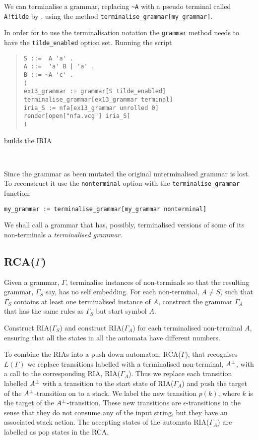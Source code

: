 We can terminalise a grammar, replacing \verb+~A+ with a
pseudo terminal called \verb+A!tilde+ by \gtbs, using the method
\verb+terminalise_grammar[my_grammar]+.

In order
for \gtb to use the terminalisation notation the \verb+grammar+ method
needs to have the \verb+tilde_enabled+ option set. 
Running the script
\begin{quote}
\begin{verbatim}
S ::=  A 'a' .
A ::=  'a' B | 'a' .
B ::= ~A 'c' .
(
ex13_grammar := grammar[S tilde_enabled]
terminalise_grammar[ex13_grammar terminal]
iria_S := nfa[ex13_grammar unrolled 0]
render[open["nfa.vcg"] iria_S]
)
\end{verbatim}
\end{quote}
builds the IRIA
\begin{center}
\\[2mm]
\end{center}


Since the grammar as been mutated the original unterminalised grammar is
lost. To reconstruct it
use the \verb+nonterminal+ option with the \verb+terminalise_grammar+
function.
\begin{center}
\verb+my_grammar := terminalise_grammar[my_grammar nonterminal]+
\end{center}

We shall call a grammar that has, possibly, terminalised versions of
some of its non-terminals a {\em terminalised grammar}. 

\subsection{RCA($\Gamma$)}

Given a grammar, $\Gamma$, terminalise instances of non-terminals
so that the resulting grammar, $\Gamma_S$ say, has no
self embedding. 
For each non-terminal, $A\not= S$, such that $\Gamma_S$ contains at least one
terminalised instance of $A$, 
construct the grammar $\Gamma_A$ that
has the same rules as $\Gamma_S$ but start symbol $A$.

Construct RIA($\Gamma_S$) and construct RIA($\Gamma_A$) for each
terminalised non-terminal $A$, ensuring that all the states in all the
automata have different numbers.

To combine the RIAs into a push down automaton, RCA($\Gamma$),
that recognises $L(\Gamma)$
we replace transitions labelled with a terminalised non-terminal,
${A}^{\perp}$, with a call to the corresponding RIA, RIA($\Gamma_A$).
Thus we replace each
transition labelled ${A}^{\perp}$ with a transition to the start state of
RIA($\Gamma_A$) and push the target of the ${A}^{\perp}$-transition on to a
stack. We label the new transition $p(k)$, where $k$ is the
target of the ${A}^{\perp}$-transition. These new transitions are
$\epsilon$-transitions in the sense that they do not consume any of
the input string, but they have an associated stack action.
The accepting states of the automata RIA($\Gamma_A$) are labelled as
pop states in the RCA. 


